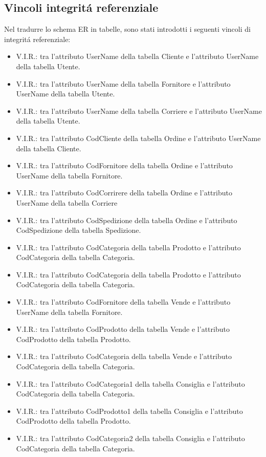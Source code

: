 \subsection{Vincoli integritá referenziale}
Nel tradurre lo schema ER in tabelle, sono stati introdotti i seguenti vincoli di integritá referenziale:
\begin{itemize}
	\item  V.I.R.: tra l’attributo UserName della tabella Cliente
	e l’attributo UserName della tabella Utente.
	\item V.I.R.: tra l’attributo UserName della tabella
	Fornitore e l’attributo UserName della tabella
	Utente.
	\item V.I.R.: tra l’attributo UserName della tabella
	Corriere e l’attributo UserName della tabella Utente.
	\item V.I.R.: tra l’attributo CodCliente della tabella Ordine
	e l’attributo UserName della tabella Cliente.
	\item V.I.R.: tra l’attributo CodFornitore della tabella
	Ordine e l’attributo UserName della tabella
	Fornitore.
	\item V.I.R.: tra l’attributo CodCorrirere della tabella
	Ordine e l’attributo UserName della tabella Corriere
	\item V.I.R.: tra l’attributo CodSpedizione della tabella Ordine e l’attributo CodSpedizione della tabella Spedizione.
	\item V.I.R.: tra l’attributo CodCategoria della tabella Prodotto e l’attributo CodCategoria della tabella Categoria.
	\item V.I.R.: tra l’attributo CodCategoria della tabella Prodotto e l’attributo CodCategoria della tabella Categoria.
	\item V.I.R.: tra l’attributo CodFornitore della tabella
	Vende e l’attributo UserName della tabella Fornitore.
	\item V.I.R.: tra l’attributo CodProdotto della tabella Vende
	e l’attributo CodProdotto della tabella Prodotto.
	\item V.I.R.: tra l’attributo CodCategoria della tabella Vende e l’attributo CodCategoria della tabella Categoria.
	\item V.I.R.: tra l’attributo CodCategoria1 della tabella Consiglia e l’attributo CodCategoria della tabella Categoria.
	\item V.I.R.: tra l’attributo CodProdotto1 della
	tabella Consiglia e l’attributo CodProdotto della tabella Prodotto.
	\item V.I.R.: tra l’attributo CodCategoria2 della tabella Consiglia e l’attributo CodCategoria della tabella Categoria.

\end{itemize}
